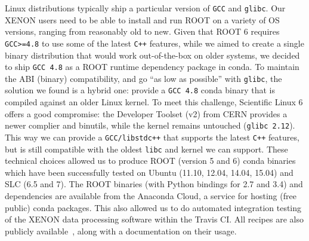 \documentclass[a4paper]{jpconf}
\begin{document}
Linux distributions typically ship a particular version of \texttt{GCC} and \texttt{glibc}.
Our XENON users need to be able to install and run ROOT on a variety of OS versions, ranging from reasonably old to new.
Given that ROOT 6 requires \texttt{GCC>=4.8} to use some of the latest \texttt{C++} features, while we aimed to create a single binary distribution that would work 
out-of-the-box on older systems, we decided to ship \texttt{GCC 4.8} as a ROOT runtime dependency package in conda.
To maintain the ABI (binary) compatibility, and go ``as low as possible'' with \texttt{glibc}, the solution we found is a hybrid one: 
provide a \texttt{GCC 4.8} conda binary that is compiled against an older Linux kernel.
To meet this challenge, Scientific Linux 6 offers a good compromise: the Developer Toolset (v2) from CERN provides 
a newer complier and binutils, while the kernel remains untouched (\texttt{glibc 2.12}). This way we can provide a \texttt{GCC/libstdc++}
that supports the latest \texttt{C++} features, but is still compatible with the oldest \texttt{libc} and kernel we can support.
These technical choices allowed us to produce ROOT (version 5 and 6) conda binaries which have been successfully tested on Ubuntu (11.10, 12.04, 14.04, 15.04) and SLC (6.5 and 7).
The ROOT binaries (with Python bindings for 2.7 and 3.4) and dependencies are available from the Anaconda Cloud, a service for hosting (free public) conda packages.
This also allowed us to do automated integration testing of the XENON data processing software within the Travis CI.
All recipes are also publicly available~\cite{daniela_remenska_2016_47512}, along with a documentation on their usage.
\end{document}
